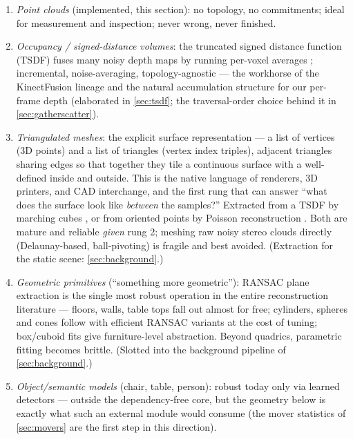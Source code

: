 \documentclass[11pt]{article}
\theoremstyle{definition}
\begin{document}
\begin{enumerate}
  \item \emph{Point clouds} (implemented, this section): no topology, no
        commitments;
        ideal for measurement and inspection; never wrong, never finished.
  \item \emph{Occupancy / signed-distance volumes}: the truncated signed
        distance function (TSDF) fuses many noisy depth maps by running
        per-voxel averages \cite{CurlessLevoy1996}; incremental,
        noise-averaging, topology-agnostic --- the workhorse of the
        KinectFusion lineage \cite{Newcombe2011} and the natural
        accumulation structure for our per-frame depth
        (elaborated in \autoref{sec:tsdf}; the traversal-order choice
        behind it in \autoref{sec:gatherscatter}).
  \item \emph{Triangulated meshes}: the explicit surface representation
        --- a list of vertices (3D points) and a list of triangles
        (vertex index triples), adjacent triangles sharing edges so that
        together they tile a continuous surface with a well-defined
        inside and outside. This is the native language of renderers,
        3D printers, and CAD interchange, and the first rung that can
        answer ``what does the surface look like \emph{between} the
        samples?'' Extracted from a TSDF by marching
        cubes \cite{Lorensen1987}, or from oriented points by Poisson
        reconstruction \cite{Kazhdan2006}. Both are mature and reliable
        \emph{given} rung 2; meshing raw noisy stereo clouds directly
        (Delaunay-based, ball-pivoting) is fragile and best avoided.
        (Extraction for the static scene: \autoref{sec:background}.)
  \item \emph{Geometric primitives} (``something more geometric''):
        RANSAC plane extraction \cite{FischlerBolles1981} is the single
        most robust operation in the entire reconstruction literature ---
        floors, walls, table tops fall out almost for free; cylinders,
        spheres and cones follow with efficient RANSAC variants
        \cite{Schnabel2007} at the cost of tuning; box/cuboid fits give
        furniture-level abstraction. Beyond quadrics, parametric fitting
        becomes brittle. (Slotted into the background pipeline of
        \autoref{sec:background}.)
  \item \emph{Object/semantic models} (chair, table, person): robust today
        only via learned detectors --- outside the dependency-free core,
        but the geometry below is exactly what such an external module
        would consume (the mover statistics of \autoref{sec:movers} are
        the first step in this direction).
\end{enumerate}
\end{document}
